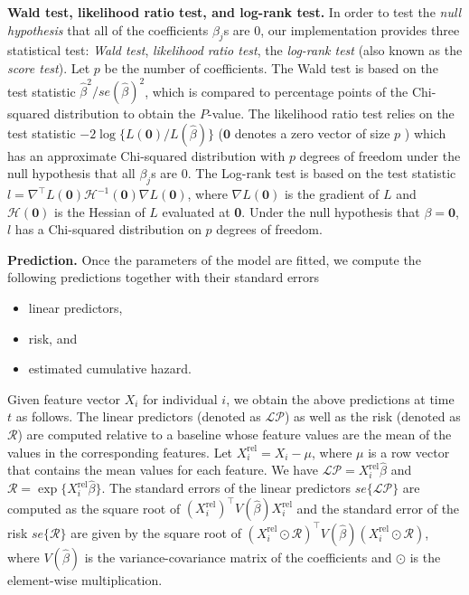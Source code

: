 \textbf{Wald test, likelihood ratio test, and log-rank test.}
In order to test the {\it null hypothesis} that all of the coefficients $\beta_j$s are 0, our implementation provides three statistical test: {\it Wald test}, {\it likelihood ratio test}, the {\it log-rank test} (also known as the {\it score test}). 
Let $p$ be the number of coefficients.
The Wald test is based on the test statistic ${\hat{\beta}}^2/{se(\hat{\beta})}^2$, which is compared to percentage points of the Chi-squared distribution to obtain the $P$-value.
The likelihood ratio test relies on the test statistic $-2\log\{ {L}(\textbf{0})/{L}(\hat{\beta}) \}$ ($\textbf{0}$ denotes a zero vector of size $p$ ) which has an approximate Chi-squared distribution with $p$ degrees of freedom under the null hypothesis that all $\beta_j$s are 0.
The Log-rank test is based on the test statistic 
$l=\nabla^\top L(\textbf{0}) {\mathcal{H}}^{-1}(\textbf{0}) \nabla L(\textbf{0})$, 
where $\nabla L(\textbf{0})$ is the gradient of $L$ and $\mathcal{H}(\textbf{0})$ is the Hessian of $L$ evaluated at \textbf{0}. Under the null hypothesis that $\beta=\textbf{0}$, $l$ has a Chi-squared distribution on $p$ degrees of freedom.


\textbf{Prediction.}
Once the parameters of the model are fitted, we compute the following predictions together with their standard errors
\begin{itemize}
	\item linear predictors,
	\item risk, and
	\item estimated cumulative hazard. 
\end{itemize}
Given feature vector $X_i$ for individual $i$, we obtain the above predictions at time $t$ as follows.
The linear predictors (denoted as $\mathcal{LP}$) as well as the risk (denoted as $\mathcal{R}$) are computed relative to a baseline whose feature values are the mean of the values in the corresponding features.
Let $X_i^\text{rel} = X_i - \mu$, where $\mu$ is a row vector that contains the mean values for each feature.  
We have  $\mathcal{LP}=X_i^\text{rel} \hat{\beta}$ and $\mathcal{R}=\exp\{ X_i^\text{rel}\hat{\beta} \}$.
The standard errors of the linear predictors $se\{\mathcal{LP} \}$ are computed as the square root of ${(X_i^\text{rel})}^\top V(\hat{\beta}) X_i^\text{rel}$ and the standard error of the risk $se\{ \mathcal{R} \}$ are given by the square root of 
${(X_i^\text{rel} \odot \mathcal{R})}^\top V(\hat{\beta}) (X_i^\text{rel} \odot \mathcal{R})$, where $V(\hat{\beta})$ is the variance-covariance matrix of the coefficients and $\odot$ is the element-wise multiplication.     

